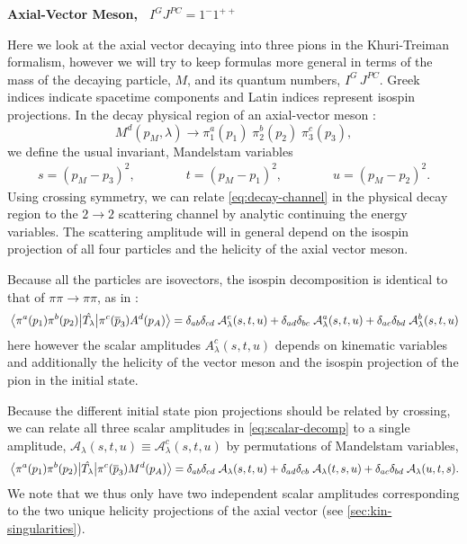 \documentclass[10pt, aps,prd,amsmath,amssymb,superscriptaddress,onecolumn,
nofootinbib,showpacs,preprintnumbers]{revtex4-1}
\begin{document}
\begin{center}
\large \textbf{Axial-Vector Meson, \, \(I^G J^{PC} = 1^-1^{++}\)}
\end{center}
Here we look at the axial vector decaying into three pions in the Khuri-Treiman formalism, however we will try to keep formulas more general in terms of the mass of the decaying particle, \(M\), and its quantum numbers, \(I^G \, J^{PC}\). Greek indices indicate spacetime components and Latin indices represent isospin projections.
In the decay physical region of an axial-vector meson :
  \begin{equation}
    \label{eq:decay-channel}
    M^d(p_M, \lambda) \rightarrow \pi_1^a(p_1)\;  \pi_2^b(p_2) \; \pi^c_3(p_3),
  \end{equation}
we define the usual invariant, Mandelstam variables
  \begin{align} \label{eq:invariants}
    s = (p_M - p_3)^2,  \qquad \qquad t = (p_M - p_1)^2,  \qquad  \qquad u = (p_M-p_2)^2.
  \end{align}
Using crossing symmetry, we can relate \cref{eq:decay-channel} in the physical decay region to the \(2\to2\) scattering channel by analytic continuing the energy variables. The scattering amplitude will in general depend on the isospin projection of all four particles and the helicity of the axial vector meson.

Because all the particles are isovectors, the isospin decomposition is identical to that of \(\pi\pi\to\pi\pi\), as in \cite{Albaladejo2018}:
  \begin{equation}
    \mel{\pi^a(p_1)\pi^b(p_2)}{\hat{T_\lambda}}{\pi^c(\overline{p}_3)A^d(p_A)} = \delta_{ab}\delta_{cd} \; \mathcal{A}^{c}_\lambda(s,t,u) + \delta_{ad}\delta_{bc} \; \mathcal{A}^{a}_\lambda(s,t,u) + \delta_{ac}\delta_{bd} \; \mathcal{A}^{b}_\lambda(s,t,u)
  \end{equation}
  here however the scalar amplitudes \(A^c_\lambda(s,t,u)\) depends on kinematic variables and additionally the helicity of the vector meson and the isospin projection of the pion in the initial state.

Because the different initial state pion projections should be related by crossing, we can relate all three scalar amplitudes in \cref{eq:scalar-decomp} to a single amplitude, \(\mathcal{A}_\lambda(s,t,u) \equiv \mathcal{A}_\lambda^{c}(s,t,u)\) by permutations of Mandelstam variables,
\begin{equation}
  \label{eq:scalar-decomp}
  \mel{\pi^a(p_1)\pi^b(p_2)}{\hat{T_\lambda}}{\pi^c(\overline{p}_3)M^d(p_A)} = \delta_{ab}\delta_{cd} \; \mathcal{A}_\lambda(s,t,u) + \delta_{ad}\delta_{cb} \; \mathcal{A}_\lambda(t,s,u) + \delta_{ac}\delta_{bd} \; \mathcal{A}_\lambda(u,t,s).
\end{equation}
We note that we thus only have two independent scalar amplitudes corresponding to the two unique helicity projections of the axial vector (see \cref{sec:kin-singularities}).
\end{document}
